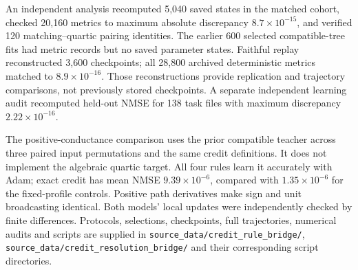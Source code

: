 An independent analysis recomputed 5,040 saved states in the matched cohort, checked 20,160 metrics to maximum absolute discrepancy $8.7\times10^{-15}$, and verified 120 matching--quartic pairing identities. The earlier 600 selected compatible-tree fits had metric records but no saved parameter states. Faithful replay reconstructed 3,600 checkpoints; all 28,800 archived deterministic metrics matched to $8.9\times10^{-16}$. Those reconstructions provide replication and trajectory comparisons, not previously stored checkpoints. A separate independent learning audit recomputed held-out NMSE for 138 task files with maximum discrepancy $2.22\times10^{-16}$.

The positive-conductance comparison uses the prior compatible teacher across three paired input permutations and the same credit definitions. It does not implement the algebraic quartic target. All four rules learn it accurately with Adam; exact credit has mean NMSE $9.39\times10^{-6}$, compared with $1.35\times10^{-6}$ for the fixed-profile controls. Positive path derivatives make sign and unit broadcasting identical. Both models' local updates were independently checked by finite differences. Protocols, selections, checkpoints, full trajectories, numerical audits and scripts are supplied in \texttt{source\_data/credit\_rule\_bridge/}, \texttt{source\_data/credit\_resolution\_bridge/} and their corresponding script directories.
